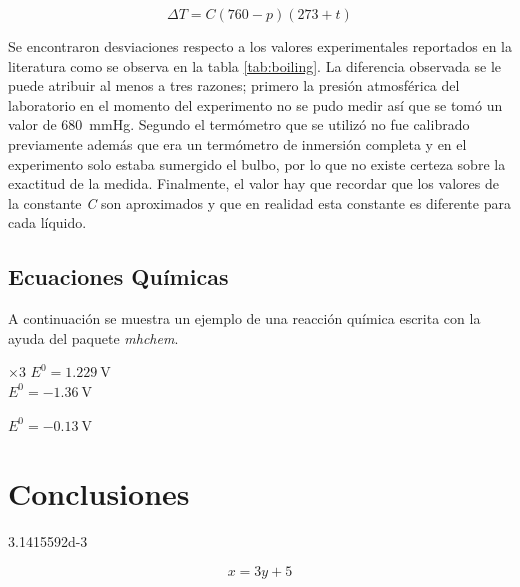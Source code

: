 \documentclass[letterpaper]{article}
\begin{document}
\begin{equation}
\label{eq:bpcorrection}
\Delta T = C(760 - p)(273 + t)
\end{equation}

Se encontraron desviaciones respecto a los valores experimentales reportados en la literatura como se observa en la tabla \ref{tab:boiling}. La diferencia observada se le puede atribuir al menos a tres razones; primero la presión atmosférica del laboratorio en el momento del experimento no se pudo medir así que se tomó un valor de \SI{680}{\mmHg}. Segundo el termómetro que se utilizó no fue calibrado previamente además que era un termómetro de inmersión completa y en el experimento solo estaba sumergido el bulbo, por lo que no existe certeza sobre la exactitud de la medida. Finalmente, el valor hay que recordar que los valores de la constante \textit{C} son aproximados y que en realidad esta constante es diferente para cada líquido.

\subsection{Ecuaciones Químicas}

A continuación se muestra un ejemplo de una reacción química escrita con la ayuda del paquete \textit{mhchem}.

\begin{center}
	 \hspace{19mm} $\times 3$ \hspace{20mm} $E^0 = \SI{1.229}{\volt}$\\
	\vspace{3mm}
	 \hspace{24mm} $E^0 = \SI{-1.36}{\volt}$\\
	\underline{\hspace{145mm}}
	
	 \hspace{15mm} $E^0 = \SI{-0.13}{\volt}$\\
\end{center}

\section{Conclusiones}
\num{3.1415592d-3}

\begin{equation}
\label{eq:ensayo}
x=3y+5
\end{equation}
\end{document}
